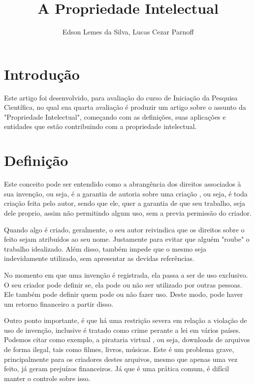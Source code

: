 \documentclass[12pt]{article}
\title{A Propriedade Intelectual}
\author{Edson Lemes da Silva\inst{1}, Lucas Cezar Parnoff\inst{1}  }
\begin{document}
 

\maketitle

\begin{abstract}
  
\end{abstract}
     
\begin{resumo} 
  
\end{resumo}

\section{Introdução}\label{sec:introducao}

Este artigo foi desenvolvido, para avaliação
do curso de Iniciação da Pesquisa Científica, no qual
sua quarta avaliação é produzir um artigo sobre o assunto da
"Propriedade Intelectual", começando com as definições,
suas aplicações e entidades que estão contribuindo com
a propriedade intelectual.
\section{Definição}\label{sec:conteudo}

Este conceito pode ser entendido como a abrangência  dos direitos associados à sua invenção, ou seja, é a garantia de autoria sobre uma criação \cite{UFAL}, ou seja, é toda criação feita pelo autor, sendo que ele, quer a garantia de que seu trabalho, seja dele proprio, assim não permitindo algum uso, sem a previa permissão do criador.

Quando algo é criado, geralmente, o seu autor reivindica que os direitos sobre o feito sejam atribuídos ao seu nome. Justamente para evitar que alguém "roube" o trabalho idealizado. Além disso, também impede que o mesmo seja indevidamente utilizado, sem apresentar as devidas referências.

No momento em que uma invenção é registrada, ela passa a ser de uso exclusivo. O seu criador pode definir se, ela pode ou não ser utilizado por outras pessoas. Ele também pode definir quem pode ou não fazer uso. Deste modo, pode haver um retorno financeiro a partir disso.

Outro ponto importante, é que há uma restrição severa em relação a violação de uso de invenção, inclusive é tratado como crime perante a lei em vários países. Podemos citar como exemplo, a pirataria virtual \cite{PIRATE}, ou seja, downloads de arquivos de forma ilegal, tais como filmes, livros, músicas. Este é um problema grave, principalmente para os criadores destes arquivos, mesmo que apenas uma vez feito, já geram prejuízos financeiros. Já que é uma prática comum, é difícil manter o controle sobre isso.
\end{document}

